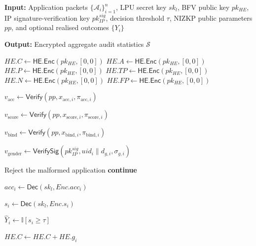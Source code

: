 \documentclass[a4paper,fleqn]{cas-dc}
\begin{document}
\begin{algorithm}[h]
\caption{Secure Loan Processing and Encrypted Audit Aggregation}
\label{alg:loan_processing}

\textbf{Input:}
Application packets $\{\mathcal{A}_i\}_{i=1}^{n}$,
LPU secret key $sk_l$,
BFV public key $pk_{HE}$,
IP signature-verification key $pk_{IP}^{sig}$,
decision threshold $\tau$,
NIZKP public parameters $pp$,
and optional realised outcomes $\{Y_i\}$

\textbf{Output:}
Encrypted aggregate audit statistics $\mathcal{S}$

\begin{algorithmic}[1]

\State $HE.C \leftarrow \mathsf{HE.Enc}(pk_{HE},[0,0])$
\State $HE.A \leftarrow \mathsf{HE.Enc}(pk_{HE},[0,0])$
\State $HE.P \leftarrow \mathsf{HE.Enc}(pk_{HE},[0,0])$
\State $HE.TP \leftarrow \mathsf{HE.Enc}(pk_{HE},[0,0])$
\State $HE.N \leftarrow \mathsf{HE.Enc}(pk_{HE},[0,0])$
\State $HE.FP \leftarrow \mathsf{HE.Enc}(pk_{HE},[0,0])$


    \State $v_{\mathrm{acc}}
        \leftarrow
        \mathsf{Verify}
        (pp,x_{\mathrm{acc},i},\pi_{\mathrm{acc},i})$

    \State $v_{\mathrm{score}}
        \leftarrow
        \mathsf{Verify}
        (pp,x_{\mathrm{score},i},\pi_{\mathrm{score},i})$

    \State $v_{\mathrm{bind}}
        \leftarrow
        \mathsf{Verify}
        (pp,x_{\mathrm{bind},i},\pi_{\mathrm{bind},i})$

    \State $v_{\mathrm{gender}}
        \leftarrow
        \mathsf{VerifySig}
        (pk_{IP}^{sig},
        uid_i\parallel d_{g,i},
        \sigma_{g,i})$

        \State Reject the malformed application
        \State \textbf{continue}
    \EndIf

    \State $acc_i
        \leftarrow
        \mathsf{Dec}(sk_l,Enc.acc_i)$

    \State $s_i
        \leftarrow
        \mathsf{Dec}(sk_l,Enc.s_i)$

    \State $\widehat{Y}_i
        \leftarrow
        \mathbb{I}[s_i\geq\tau]$

    \State $HE.C \leftarrow HE.C + HE.g_i$


\end{algorithmic}
\end{algorithm}
\end{document}
